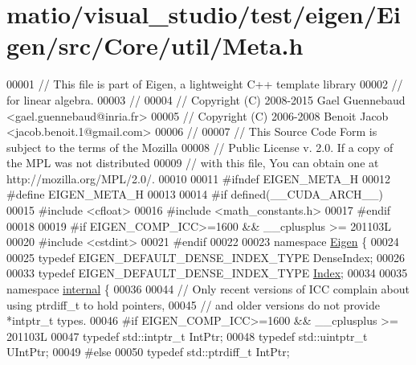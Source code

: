 \hypertarget{matio_2visual__studio_2test_2eigen_2_eigen_2src_2_core_2util_2_meta_8h_source}{}\section{matio/visual\+\_\+studio/test/eigen/\+Eigen/src/\+Core/util/\+Meta.h}
\label{matio_2visual__studio_2test_2eigen_2_eigen_2src_2_core_2util_2_meta_8h_source}

\begin{DoxyCode}
00001 \textcolor{comment}{// This file is part of Eigen, a lightweight C++ template library}
00002 \textcolor{comment}{// for linear algebra.}
00003 \textcolor{comment}{//}
00004 \textcolor{comment}{// Copyright (C) 2008-2015 Gael Guennebaud <gael.guennebaud@inria.fr>}
00005 \textcolor{comment}{// Copyright (C) 2006-2008 Benoit Jacob <jacob.benoit.1@gmail.com>}
00006 \textcolor{comment}{//}
00007 \textcolor{comment}{// This Source Code Form is subject to the terms of the Mozilla}
00008 \textcolor{comment}{// Public License v. 2.0. If a copy of the MPL was not distributed}
00009 \textcolor{comment}{// with this file, You can obtain one at http://mozilla.org/MPL/2.0/.}
00010 
00011 \textcolor{preprocessor}{#ifndef EIGEN\_META\_H}
00012 \textcolor{preprocessor}{#define EIGEN\_META\_H}
00013 
00014 \textcolor{preprocessor}{#if defined(\_\_CUDA\_ARCH\_\_)}
00015 \textcolor{preprocessor}{#include <cfloat>}
00016 \textcolor{preprocessor}{#include <math\_constants.h>}
00017 \textcolor{preprocessor}{#endif}
00018 
00019 \textcolor{preprocessor}{#if EIGEN\_COMP\_ICC>=1600 &&  \_\_cplusplus >= 201103L}
00020 \textcolor{preprocessor}{#include <cstdint>}
00021 \textcolor{preprocessor}{#endif}
00022 
00023 \textcolor{keyword}{namespace }\hyperlink{namespace_eigen}{Eigen} \{
00024 
00025 \textcolor{keyword}{typedef} EIGEN\_DEFAULT\_DENSE\_INDEX\_TYPE DenseIndex;
00026 
00033 \textcolor{keyword}{typedef} EIGEN\_DEFAULT\_DENSE\_INDEX\_TYPE \hyperlink{namespace_eigen_a62e77e0933482dafde8fe197d9a2cfde}{Index};
00034 
00035 \textcolor{keyword}{namespace }\hyperlink{namespaceinternal}{internal} \{
00036 
00044 \textcolor{comment}{// Only recent versions of ICC complain about using ptrdiff\_t to hold pointers,}
00045 \textcolor{comment}{// and older versions do not provide *intptr\_t types.}
00046 \textcolor{preprocessor}{#if EIGEN\_COMP\_ICC>=1600 &&  \_\_cplusplus >= 201103L}
00047 \textcolor{keyword}{typedef} std::intptr\_t  IntPtr;
00048 \textcolor{keyword}{typedef} std::uintptr\_t UIntPtr;
00049 \textcolor{preprocessor}{#else}
00050 \textcolor{keyword}{typedef} std::ptrdiff\_t IntPtr;

\end{DoxyCode}
